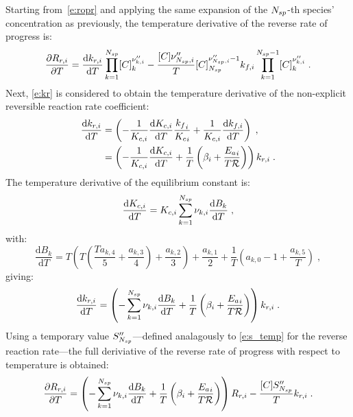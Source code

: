 \documentclass[12pt,number,sort&compress]{elsarticle}
\begin{document}
Starting from~\cref{e:ropr} and applying the same expansion of the $\ns/$-th species' concentration as previously, the temperature derivative of the reverse rate of progress is:
\begin{equation}
 \label{e:droprdt_1}
 \frac{\partial R_{r, i}}{\partial T } = \frac{\text{d} k_{r, i} }{\text{d} T } \prod_{k=1}^{\ns/} [C]_{k}^{\nu^{\prime\prime}_{k,i}} - \frac{[C] \nu^{\prime\prime}_{\ns/,i}}{T} [C]_{\ns/}^{\nu^{\prime\prime}_{\ns/,i} - 1} {k_{f, i}} \prod_{k=1}^{\ns/  - 1} [C]_{k}^{\nu^{\prime\prime}_{k,i}}\;.
\end{equation}
Next, \cref{e:kr} is considered to obtain the temperature derivative of the non-explicit reversible reaction rate coefficient:
\begin{align}
 \frac{\text{d} k_{r, i} }{\text{d} T } &= \left(- \frac{1}{{K_{c, i}}} \frac{\text{d} {K_{c, i}} }{\text{d} T } \frac{{k_f}_i}{{K_c}_i} + \frac{1}{{K_{c, i}}}\frac{\text{d} {k_{f, i}} }{\text{d} T } \right) \;, \nonumber \\
				         &= \left(- \frac{1}{{K_{c, i}}} \frac{\text{d} {K_{c, i}} }{\text{d} T } + \frac{1}{T} \left(\beta_{i} + \frac{{E_{a}}_{i}}{T \Ru/}\right)\right) {k_{r, i}}\;.
\end{align}
The temperature derivative of the equilibrium constant is:
\begin{equation}
 \frac{\text{d} {K_{c, i}} }{\text{d} T } = {K_{c, i}} \sum_{k=1}^{\ns/} \nu_{k,i} \frac{\text{d} B_{k} }{\text{d} T } \;,
\end{equation}
with:
\begin{equation}
 \frac{\text{d} B_{k} }{\text{d} T } = T \left(T \left(\frac{T a_{k,4}}{5} + \frac{a_{k,3}}{4}\right) + \frac{a_{k,2}}{3}\right) + \frac{a_{k,1}}{2} + \frac{1}{T} \left(a_{k,0} - 1 + \frac{a_{k,5}}{T}\right)\;,
\end{equation}
giving:
\begin{equation}
\label{e:dkr_dt}
\frac{\text{d} k_{r, i} }{\text{d} T } = \left(- \sum_{k=1}^{\ns/} \nu_{k,i} \frac{\text{d} B_{k}}{\text{d} T } + \frac{1}{T} \left(\beta_{i} + \frac{{E_{a}}_{i}}{T \Ru/}\right)\right) {k_{r, i}} \;.
\end{equation}
Using a temporary value $S^{\prime\prime}_{\ns/}$---defined analagously to \cref{e:s_temp} for the reverse reaction rate---the full deriviative of the reverse rate of progress with respect to temperature is obtained:
\begin{equation}
\label{e:dropr_dt}
\frac{\partial R_{r, i}}{\partial T } = \left(- \sum_{k=1}^{\ns/} \nu_{k,i} \frac{\text{d} B_{k}}{\text{d} T } + \frac{1}{T} \left(\beta_{i} + \frac{{E_{a}}_{i}}{T \Ru/}\right)\right) {R_{r, i}} - \frac{[C] S^{\prime\prime}_{\ns/}}{T} {k_{r, i}}\;.
\end{equation}
\end{document}

